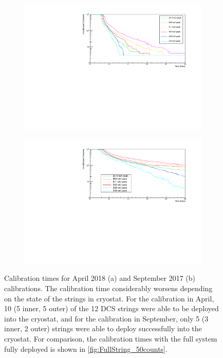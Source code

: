 \begin{figure}[htbp]
\centering
\begin{subfigure}[t]{0.9\textwidth}
\centering
\includegraphics[width=\textwidth]{Figures/April2018_50counts.pdf}
\caption{}
\label{fig:april_calibration}
\end{subfigure}
\qquad
\begin{subfigure}[t]{0.9\textwidth}
\centering
\includegraphics[width=\textwidth]{Figures/Sep2017_50counts.pdf}
\caption{}
\label{fig:september_calibration}
\end{subfigure}
\caption[Calibration times for April 2018 (a) and September 2017 (b) calibrations]
{Calibration times for April 2018 (a) and September 2017 (b) calibrations.
The calibration time considerably worsens depending on the state of the strings in cryostat.
For the calibration in April, 10 (5 inner, 5 outer) of the 12 DCS strings were able to be deployed into the cryostat, and for the calibration in September, only 5 (3 inner, 2 outer) strings were able to deploy successfully into the cryostat.
For comparison, the calibration times with the full system fully deployed is shown in \autoref{fig:FullString_50counts}.}
\label{fig:calibrations_50counts}
\end{figure}

